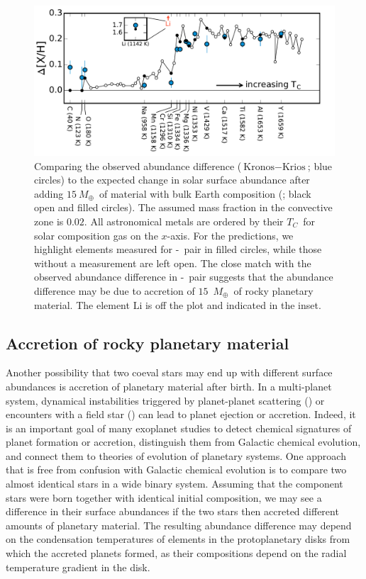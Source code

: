\documentclass[modern, letterpaper]{aastex61}
\newcommand*\elem[1]{\ensuremath{\mathrm{#1}}}
\newcommand{\sunanalog}{\text{Krios}}
\newcommand{\bizarreone}{\text{Kronos}}
\newcommand{\Tcondens}{\ensuremath{T_C}}
\newcommand{\mearth}{\ensuremath{M_\oplus}}
\newcommand{\maccreted}{\ensuremath{15~\mearth}}
\begin{document}
\begin{figure}[htpb]
  \centering
  \includegraphics[width=0.95\linewidth]{deltaxh_tcrank.pdf}
  \caption{
    Comparing the observed abundance difference ($\bizarreone-\sunanalog$; blue
    circles) to the expected change in solar surface abundance after adding
    \maccreted\ of material with bulk Earth composition
    (\citealt{2003TrGeo...2..547M}; black open and filled circles).
    The assumed mass fraction in the convective zone is $0.02$.
    All astronomical metals are ordered by their \Tcondens\ for solar
    composition gas on the $x$-axis.
    For the predictions, we highlight elements measured for \bizarreone-\sunanalog\ pair
    in filled circles, while those without a measurement are left open.
    The close match with the observed abundance difference in \bizarreone-\sunanalog\ pair
    suggests that the abundance difference may be due to accretion of
    $15$~\mearth\ of rocky planetary material.
    The element \elem{Li} is off the plot and indicated in the inset.
  }
  \label{fig:toycalc}
\end{figure}

\subsection{Accretion of rocky planetary material}
\label{sub:accretion}

Another possibility that two coeval stars may end up with different surface
abundances is accretion of planetary material after birth.
In a multi-planet system, dynamical instabilities triggered by planet-planet
scattering (\citealt{1996Sci...274..954R,1996Natur.384..619W}) or encounters with a
field star (\citealt{Malmberg:2011aa}) can lead to planet ejection or accretion.
Indeed, it is an important goal of many exoplanet studies
to detect chemical signatures of planet formation or accretion,
distinguish them from Galactic chemical evolution, and
connect them to theories of evolution of planetary systems.
One approach that is free from confusion with Galactic chemical evolution
is to compare two almost identical stars in a wide binary system.
Assuming that the component stars were born together with identical
initial composition, we may see a difference in their surface abundances
if the two stars then accreted different amounts of planetary material.
The resulting abundance difference may depend on the condensation
temperatures of elements in the protoplanetary disks from which the accreted
planets formed, as their compositions depend on the radial temperature gradient
in the disk.
\end{document}
